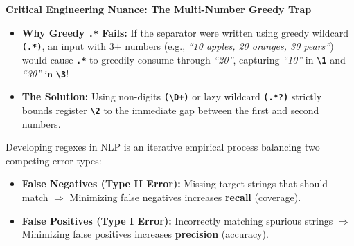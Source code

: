 \documentclass[10pt,a4paper]{article}
\newcommand{\rx}[1]{\texttt{\bfseries\color{inlinecode}#1}}
\begin{document}
\begin{insightbox}[title={\bfseries\sffamily Solved Slide Exercise: Delimiting First and Second Numbers (Slide 20 Task)}]
\vspace{2pt}
\noindent\textbf{Critical Engineering Nuance: The Multi-Number Greedy Trap}
\begin{itemize}[leftmargin=12pt, itemsep=1.5pt, parsep=0pt, topsep=1pt]
    \item \textbf{Why Greedy \rx{.*} Fails:} If the separator were written using greedy wildcard \rx{(.*)}, an input with 3+ numbers (e.g., \textit{``10 apples, 20 oranges, 30 pears''}) would cause \rx{.*} to greedily consume through \textit{``20''}, capturing \textit{``10''} in \rx{\textbackslash 1} and \textit{``30''} in \rx{\textbackslash 3}!
    \item \textbf{The Solution:} Using non-digits \rx{(\textbackslash D+)} or lazy wildcard \rx{(.*?)} strictly bounds register \rx{\textbackslash 2} to the immediate gap between the first and second numbers.
\end{itemize}
\end{insightbox}

\vspace{3pt}
\par\vspace{1pt}
Developing regexes in NLP is an iterative empirical process balancing two competing error types:

\begin{itemize}[leftmargin=12pt, itemsep=1.5pt, parsep=0pt, topsep=1pt]
    \item \textbf{False Negatives (Type II Error):} Missing target strings that should match $\Longrightarrow$ Minimizing false negatives increases \textbf{recall} (coverage).
    \item \textbf{False Positives (Type I Error):} Incorrectly matching spurious strings $\Longrightarrow$ Minimizing false positives increases \textbf{precision} (accuracy).
\end{itemize}
\end{document}
